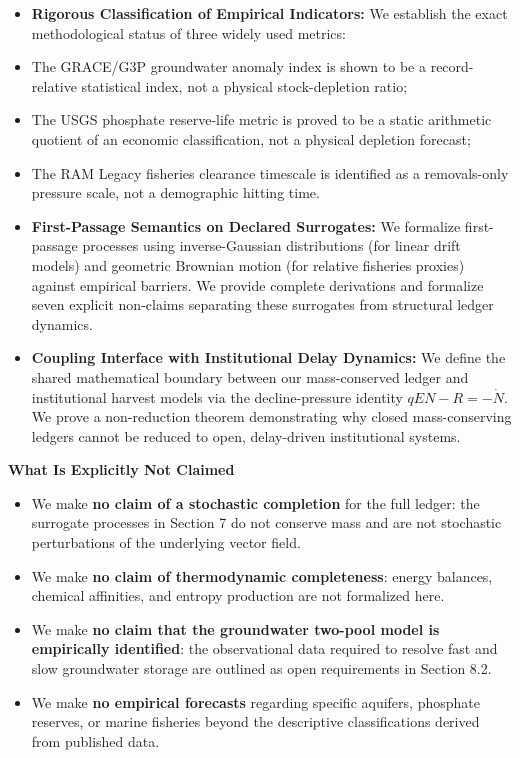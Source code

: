 \documentclass[11pt]{article}
\begin{document}
\begin{itemize}\setlength{\itemsep}{2pt}
\item \textbf{Rigorous Classification of Empirical Indicators:} We establish the exact methodological status of three widely used metrics:
\item The GRACE/G3P groundwater anomaly index is shown to be a record-relative statistical index, not a physical stock-depletion ratio;
\item The USGS phosphate reserve-life metric is proved to be a static arithmetic quotient of an economic classification, not a physical depletion forecast;
\item The RAM Legacy fisheries clearance timescale is identified as a removals-only pressure scale, not a demographic hitting time.
\item \textbf{First-Passage Semantics on Declared Surrogates:} We formalize first-passage processes using inverse-Gaussian distributions (for linear drift models) and geometric Brownian motion (for relative fisheries proxies) against empirical barriers. We provide complete derivations and formalize seven explicit non-claims separating these surrogates from structural ledger dynamics.
\item \textbf{Coupling Interface with Institutional Delay Dynamics:} We define the shared mathematical boundary between our mass-conserved ledger and institutional harvest models via the decline-pressure identity \(qEN - R = -\dot{N}\). We prove a non-reduction theorem demonstrating why closed mass-conserving ledgers cannot be reduced to open, delay-driven institutional systems.
\end{itemize}

\textbf{What Is Explicitly Not Claimed}

\begin{itemize}\setlength{\itemsep}{2pt}
\item We make \textbf{no claim of a stochastic completion} for the full ledger: the surrogate processes in Section 7 do not conserve mass and are not stochastic perturbations of the underlying vector field.
\item We make \textbf{no claim of thermodynamic completeness}: energy balances, chemical affinities, and entropy production are not formalized here.
\item We make \textbf{no claim that the groundwater two-pool model is empirically identified}: the observational data required to resolve fast and slow groundwater storage are outlined as open requirements in Section 8.2.
\item We make \textbf{no empirical forecasts} regarding specific aquifers, phosphate reserves, or marine fisheries beyond the descriptive classifications derived from published data.
\end{itemize}
\end{document}
